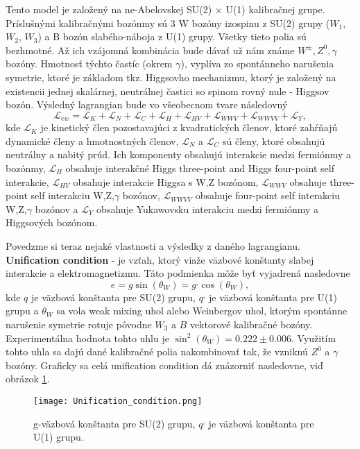 \documentclass[../../main.tex]{subfiles}
\begin{document}
Tento model je založený na ne-Abelovskej SU(2) $\times$ U(1) kalibračnej grupe. Príslušnými kalibračnými bozónmy sú 3 W bozóny izospinu z SU(2) grupy ($W_1$, $W_2$, $W_3$) a B bozón slabého-náboja z U(1) grupy. Všetky tieto polia sú bezhmotné. Až ich vzájomná kombinácia bude dávať už nám známe $W^{\pm}, Z^0, \gamma$ bozóny. Hmotnosť týchto častíc (okrem $\gamma$), vyplíva zo spontánneho narušenia symetrie, ktoré je základom tkz. Higgsovho mechanizmu, ktorý je založený na existencii jednej skalárnej, neutrálnej častici so spinom rovný nule - Higgsov bozón. Výsledný lagrangian bude vo všeobecnom tvare následovný
\begin{equation}
\mathcal{L}_{ew}=\mathcal{L}_{K}+\mathcal{L}_{N}+\mathcal{L}_{C}+\mathcal{L}_{H}+\mathcal{L}_{HV}+\mathcal{L}_{WWV}+\mathcal{L}_{WWVV}+\mathcal{L}_{Y},
\end{equation}
kde $\mathcal{L}_{K}$ je kinetický člen pozostavajúci z kvadratických členov, ktoré zahŕňajú dynamické členy a hmotnostných členov, $\mathcal{L}_{N}$ a $\mathcal{L}_{C}$ sú členy, ktoré obsahujú neutrálny a nabitý prúd. Ich komponenty obsahujú interakcie medzi fermiónmy a bozónmy, $\mathcal{L}_{H}$ obsahuje interakčné Higgs three-point and Higgs four-point self interakcie, $\mathcal{L}_{HV}$ obsahuje interakcie Higgsa s W,Z bozónom, $\mathcal{L}_{WWV}$
obsahuje three-point self interakciu W,Z,$\gamma$ bozónov, $\mathcal{L}_{WWVV}$ obsahuje four-point self interakciu W,Z,$\gamma$ bozónov a $\mathcal{L}_{Y}$ obsahuje Yukawovsku interakciu medzi fermiónmy a Higgsových bozónom.

Povedzme si teraz nejaké vlastnosti a výsledky z daného lagrangianu. \textbf{Unification condition} - je vzťah, ktorý viaže väzbové konštanty slabej interakcie a elektromagnetizmu. Táto podmienka môže byť vyjadrená nasledovne 
$$
e=g\sin(\theta_W)=g^,\cos(\theta_W),
$$
kde $q$ je väzbová konštanta pre SU(2) grupu, $q^,$ je väzbová konštanta pre U(1) grupu a $\theta_W$ sa vola weak mixing uhol alebo Weinbergov uhol, ktorým spontánne narušenie symetrie rotuje pôvodne $W_3$ a $B$ vektorové kalibračné bozóny. Experimentálna hodnota tohto uhlu je $\sin^2(\theta_W)=0.222\pm0.006$. Využitím tohto uhla sa dajú dané kalibračné polia nakombinovať tak, že vzniknú $Z^0$ a $\gamma$ bozóny. Graficky sa celá unification condition dá znázorniť nasledovne, viď obrázok \ref{sf1:fig:unifi}.
\begin{figure}[!h]
\centering
\texttt{[image: Unification\_condition.png]}
\caption{g-väzbová konštanta pre SU(2) grupu, $q^{,}$ je väzbová konštanta pre U(1) grupu.}
\label{sf1:fig:unifi}
\end{figure}
\end{document}
